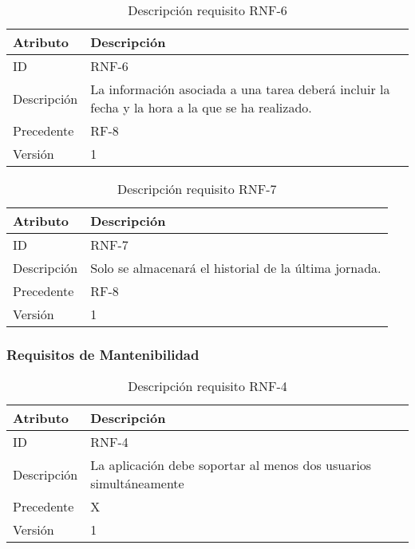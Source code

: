 \begin{table}[H]
    \label{tab:reqNF7}
 	\caption{Descripción requisito RNF-6}
	\centering

	\begin{tabular}{C{3cm}|C{12cm}}
 		\toprule
 		\textbf{Atributo} & \textbf{Descripción} \\
 		\midrule
 	    ID & RNF-6 \\
 	    Descripción & La información asociada a una tarea deberá incluir la fecha y la hora a la que se ha realizado. \\
 	    Precedente & RF-8 \\
 	    Versión & 1 \\
 		\bottomrule
 		\end{tabular}
\end{table}

\begin{table}[H]
    \label{tab:reqNF8}
 	\caption{Descripción requisito RNF-7}
	\centering

	\begin{tabular}{C{3cm}|C{12cm}}
 		\toprule
 		\textbf{Atributo} & \textbf{Descripción} \\
 		\midrule
 	    ID & RNF-7 \\
 	    Descripción & Solo se almacenará el historial de la última jornada. \\
 	    Precedente & RF-8 \\
 	    Versión & 1 \\
 		\bottomrule
 		\end{tabular}
\end{table}


\subsubsection{Requisitos de Mantenibilidad}

\begin{table}[H]
    \label{tab:reqNF1}
 	\caption{Descripción requisito RNF-4}
	\centering

	\begin{tabular}{C{3cm}|C{12cm}}
 		\toprule
 		\textbf{Atributo} & \textbf{Descripción} \\
 		\midrule
 	    ID & RNF-4 \\
 	    Descripción & La aplicación debe soportar al menos dos usuarios simultáneamente \\
 	    Precedente & X \\
 	    Versión & 1 \\
 		\bottomrule
 		\end{tabular}
\end{table}

